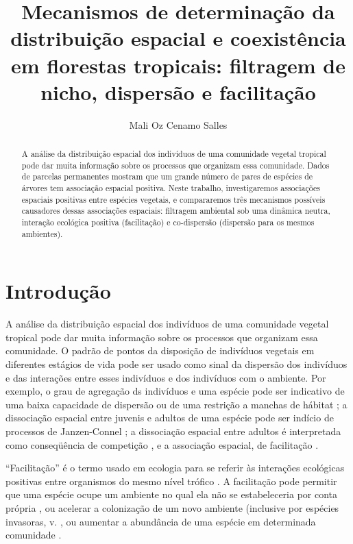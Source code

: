 \documentclass[twoside,12pt,a4paper]{report}
\begin{document}
\title{Mecanismos de determinação da distribuição espacial e coexistência em florestas tropicais:
filtragem de nicho, dispersão e facilitação}
\author{Mali Oz Cenamo Salles}


\begin{abstract}

A análise da distribuição espacial dos indivíduos de uma comunidade vegetal tropical pode dar muita
informação sobre os processos que organizam essa comunidade. Dados de parcelas permanentes mostram
que um grande número de pares de espécies de árvores tem associação espacial positiva. Neste
trabalho, investigaremos associações espaciais positivas entre espécies vegetais, e compararemos
três mecanismos possíveis causadores dessas associações espaciais: filtragem ambiental sob uma
dinâmica neutra, interação ecológica positiva (facilitação) e co-dispersão (dispersão para os mesmos
ambientes).

\end{abstract}

\section{Introdução}

A análise da distribuição espacial dos indivíduos de uma comunidade vegetal tropical pode dar muita
informação sobre os processos que organizam essa comunidade. O padrão de pontos da disposição de
indivíduos vegetais em diferentes estágios de vida pode ser usado como sinal da dispersão dos
indivíduos e das interações entre esses indivíduos e dos indivíduos com o ambiente. Por exemplo, o
grau de agregação ds indivíduos e uma espécie pode ser indicativo de uma baixa capacidade de
dispersão \citep{ref} ou de uma restrição a manchas de hábitat \citep{refs}; a dissociação espacial entre
juvenis e adultos de uma espécie pode ser indício de processos de Janzen-Connel \citep{Hubbell1979};
a dissociação espacial entre adultos é interpretada como conseqüência de competição \citep{refs}, e a
associação espacial, de facilitação \citep{Castanho2012; Haase2001}.

“Facilitação” é o termo usado em ecologia para se referir às interações ecológicas positivas entre
organismos do mesmo nível trófico \citep{Pakeman2009}. A facilitação pode permitir que uma
espécie ocupe um ambiente no qual ela não se estabeleceria por conta própria \citep{Lortie2004},
ou acelerar a colonização de um novo ambiente (inclusive por espécies invasoras, v.
\citep{Wundrow2012}, ou aumentar a abundância de uma espécie em determinada comunidade \citep{Alados2006; CallawayBook}.
\end{document}
